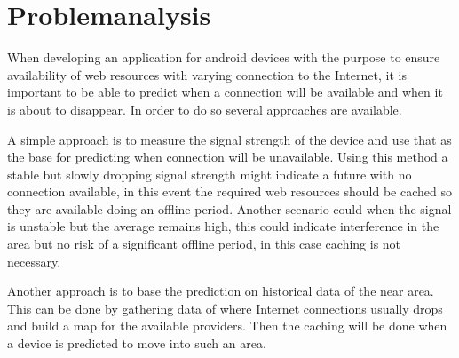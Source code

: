 \chapter{Problemanalysis}
\label{chap:prob}

When developing an application for android devices with the purpose to ensure availability of web resources with varying connection to the Internet, it is important to be able to predict when a connection will be available and when it is about to disappear. In order to do so several approaches are available.

A simple approach is to measure the signal strength of the device and use that as the base for predicting when connection will be unavailable. Using this method a stable but slowly dropping signal strength might indicate a future with no connection available, in this event the required web resources should be cached so they are available doing an offline period. Another scenario could when the signal is unstable but the average remains high, this could indicate interference in the area but no risk of a significant offline period, in this case caching is not necessary.

Another approach is to base the prediction on historical data of the near area. This can be done by gathering data of where Internet connections usually drops and build a map for the available providers. Then the caching will be done when a device is predicted to move into such an area.

